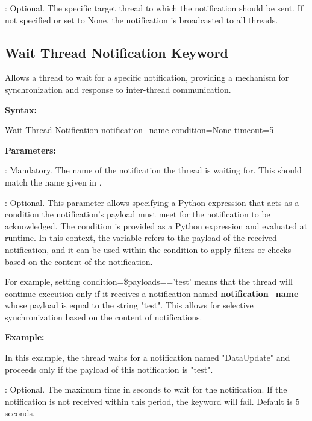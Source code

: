 : Optional. The specific target thread to which the notification should be sent. If not specified or set to None, the notification is broadcasted to all threads.

\subsection{Wait Thread Notification Keyword}

Allows a thread to wait for a specific notification, providing a mechanism for synchronization and response to inter-thread communication.

\textbf{Syntax:}

\begin{robotcode}
Wait Thread Notification     notification_name    condition=None     timeout=5
\end{robotcode}

\textbf{Parameters:}

: Mandatory. The name of the notification the thread is waiting for. This should match the name given in .

: Optional. This parameter allows specifying a Python expression that acts as a condition the notification's payload must meet for the notification to be acknowledged. The condition is provided as a Python expression and evaluated at runtime. In this context, the variable  refers to the payload of the received notification, and it can be used within the condition to apply filters or checks based on the content of the notification.


For example, setting condition=\$payloads=='test' means that the thread will continue execution only if it receives a notification named \textbf{notification\_name} whose payload is equal to the string "test". This allows for selective synchronization based on the content of notifications.

\textbf{Example:}

In this example, the thread waits for a notification named "DataUpdate" and proceeds only if the payload of this notification is "test".


: Optional. The maximum time in seconds to wait for the notification. If the notification is not received within this period, the keyword will fail. Default is 5 seconds.

